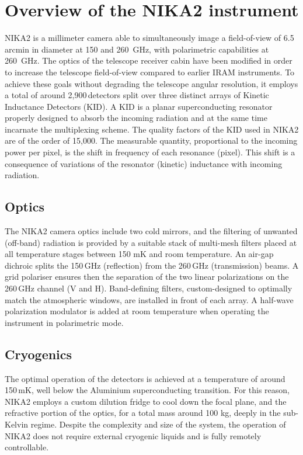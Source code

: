 
\section{Overview of the NIKA2 instrument}%

NIKA2 is a millimeter camera able to simultaneously image a field-of-view of
6.5\,arcmin in diameter at 150 and 260~GHz, with polarimetric capabilities at
260~GHz. The optics of the telescope receiver cabin have been modified in order
to increase the telescope field-of-view compared to earlier IRAM instruments. To
achieve these goals without degrading the telescope angular resolution, it
employs a total of around 2,900\,detectors split over three distinct arrays of
Kinetic Inductance Detectors (KID). A KID is a planar superconducting resonator
properly designed to absorb the incoming radiation and at the same time
incarnate the multiplexing scheme. The quality factors of the KID used in NIKA2
are of the order of 15,000.
The measurable quantity, proportional to the
incoming power per pixel, is the shift in frequency of each resonance
(pixel). This shift is a consequence of variations of the resonator (kinetic)
inductance with incoming radiation.

\subsection{Optics}

The NIKA2 camera optics include two cold mirrors, and the filtering of unwanted
(off-band) radiation is provided by a suitable stack of multi-mesh filters
placed at all temperature stages between 150 mK and room temperature. An air-gap
dichroic splits the 150\,GHz (reflection) from the 260\,GHz (transmission)
beams. A grid polariser ensures then the separation of the two linear
polarizations on the 260\,GHz channel (V and H). Band-defining filters,
custom-designed to optimally match the atmospheric windows, are installed in
front of each array. A half-wave polarization modulator is added at room
temperature when operating the instrument in polarimetric mode.




\subsection{Cryogenics}

The optimal operation of the detectors is achieved at a temperature of around
150\,mK, well below the Aluminium superconducting transition. For this reason,
NIKA2 employs a custom dilution fridge to cool down the focal plane, and the
refractive portion of the optics, for a total mass around 100 kg, deeply in the
sub-Kelvin regime. Despite the complexity and size of the system, the operation
of NIKA2 does not require external cryogenic liquids and is fully remotely
controllable.

